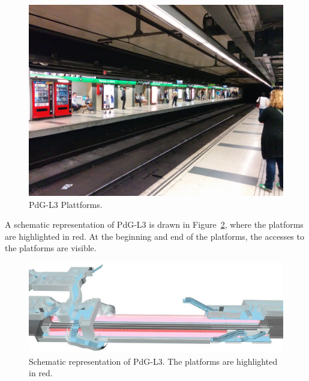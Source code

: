 \begin{figure}%
  \centering
  \includegraphics[width=\linewidth]{Figures/PdG-L3_platform.jpg} 
  \caption{PdG-L3 Plattforms. \cite{TMB_2014}}
  \label{fig:PdG-L3_platforms}
\end{figure}


A schematic representation of PdG-L3 is drawn in Figure~\ref{fig:PdG-L3_schematic}, where the platforms are highlighted in red. At the beginning and end of the platforms, the accesses to the platforms are visible.

\begin{figure}%
  \centering
  \includegraphics[width=\linewidth]{Figures/PdG-L3_schematic2.jpg} 
  \caption{Schematic representation of PdG-L3. The platforms are highlighted in red. \cite{TMB_2014}}
  \label{fig:PdG-L3_schematic}
\end{figure}


